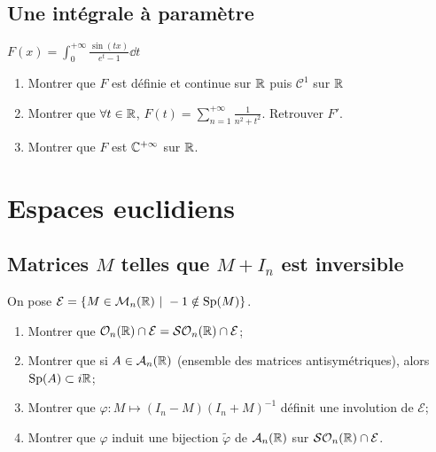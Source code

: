 \begin{sol}
	[À rédiger]
\end{sol}

\subsection{Une intégrale à paramètre}
\begin{exo}
	$F(x)=\int_0^{+\infty}\frac{\sin(tx)}{e^t-1}\dd t$
	\begin{enumerate}
		\item Montrer que $F$ est définie et continue sur $\mathbb{R}$ puis $\mathcal C^1$ sur $\mathbb{R}$
		\item Montrer que $\forall t\in \mathbb{R}$, $F(t)=\sum_{n=1}^{+\infty}\frac1{n^2+t^2}$. Retrouver $F'$.
		\item Montrer que $F$ est $\mathbb{C}^{+\infty}$ sur $\mathbb{R}$.
	\end{enumerate}
\end{exo}

\begin{sol}
	[À rédiger]
\end{sol}



%
%

\newpage
\section[Espaces euclidiens]{Espaces euclidiens}

\subsection{Matrices $M$ telles que $M+I_n$ est inversible}
\begin{exo}
	On pose $\mathcal E=\lbrace M\in\mathcal M_n(\mathbb{R})\ |\ -1\notin \text{Sp}(M)\rbrace$.
	\begin{enumerate}
		\item Montrer que $\mathcal O_n(\mathbb{R})\cap \mathcal E=\mathcal{SO}_n(\mathbb{R})\cap \mathcal E$;
		\item Montrer que si $A\in\mathcal A_n(\mathbb{R})$ (ensemble des matrices antisymétriques), alors $\text{Sp}(A)\subset i\mathbb{R}$;
		\item Montrer que $\varphi : M \mapsto (I_n-M)(I_n+M)^{-1}$ définit une involution de $\mathcal E$;
		\item Montrer que $\varphi$ induit une bijection $\tilde\varphi$ de $\mathcal A_n(\mathbb{R})$ sur $\mathcal{SO}_n(\mathbb{R})\cap \mathcal E$.
	\end{enumerate}
\end{exo}

